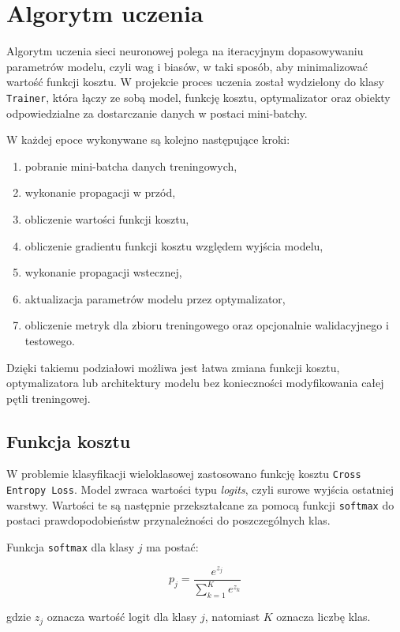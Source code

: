 \section{Algorytm uczenia}

Algorytm uczenia sieci neuronowej polega na iteracyjnym dopasowywaniu
parametrów modelu, czyli wag i biasów, w taki sposób, aby minimalizować
wartość funkcji kosztu. W projekcie proces uczenia został wydzielony do
klasy \texttt{Trainer}, która łączy ze sobą model, funkcję kosztu,
optymalizator oraz obiekty odpowiedzialne za dostarczanie danych w postaci
mini-batchy.

W każdej epoce wykonywane są kolejno następujące kroki:
\begin{enumerate}
    \item pobranie mini-batcha danych treningowych,
    \item wykonanie propagacji w przód,
    \item obliczenie wartości funkcji kosztu,
    \item obliczenie gradientu funkcji kosztu względem wyjścia modelu,
    \item wykonanie propagacji wstecznej,
    \item aktualizacja parametrów modelu przez optymalizator,
    \item obliczenie metryk dla zbioru treningowego oraz opcjonalnie
    walidacyjnego i testowego.
\end{enumerate}

Dzięki takiemu podziałowi możliwa jest łatwa zmiana funkcji kosztu,
optymalizatora lub architektury modelu bez konieczności modyfikowania całej
pętli treningowej.

\subsection{Funkcja kosztu}

W problemie klasyfikacji wieloklasowej zastosowano funkcję kosztu
\texttt{Cross Entropy Loss}. Model zwraca wartości typu \textit{logits},
czyli surowe wyjścia ostatniej warstwy. Wartości te są następnie
przekształcane za pomocą funkcji \texttt{softmax} do postaci
prawdopodobieństw przynależności do poszczególnych klas.

Funkcja \texttt{softmax} dla klasy \(j\) ma postać:

\[
    p_j =
    \frac{e^{z_j}}
    {\sum_{k=1}^{K} e^{z_k}}
\]

gdzie \(z_j\) oznacza wartość logit dla klasy \(j\), natomiast \(K\) oznacza
liczbę klas.

